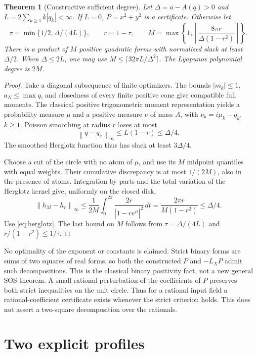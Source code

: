 \documentclass[11pt,a4paper]{article}
\newtheorem{theorem}{Theorem}[section]
\theoremstyle{remark}\newtheorem{remark}[theorem]{Remark}
\newcommand{\norm}[1]{\left\lVert #1\right\rVert}
\begin{document}
\begin{theorem}[Constructive sufficient degree]\label{thm:degree}
Let \(\Delta=a-A(q)>0\) and
\(L=2\sum_{k\geq1}k|q_k|<\infty\).
If \(L=0\), \(P=x^2+y^2\) is a certificate.
Otherwise let
\[
 \tau=\min\{1/2,\Delta/(4L)\},\qquad r=1-\tau,\qquad
 M=\max\left\{1,\left\lceil\frac{8\pi r}
                      {\Delta(1-r^2)}\right\rceil\right\}.
\]
There is a product of \(M\) positive quadratic forms with
normalized slack at least \(\Delta/2\).
When \(\Delta\leq2L\), one may use
\(M\leq\lceil32\pi L/\Delta^2\rceil\).
The Lyapunov polynomial degree is \(2M\).
\end{theorem}
\begin{proof}
Take a diagonal subsequence of finite optimizers. The bounds
\(|m_k|\leq1\), \(a_N\leq\max q\), and closedness of every finite
positive cone give compatible full moments. The classical
positive trigonometric moment representation yields a probability
measure \(\mu\) and a positive measure \(\nu\) of mass \(A\), with
\(\nu_k=i\mu_k-q_k\), \(k\geq1\).
Poisson smoothing at radius \(r\) loses at most
\[
 \norm{q-q_r}_\infty\leq L(1-r)\leq\Delta/4.
\]
The smoothed Herglotz function thus has slack at least \(3\Delta/4\).

Choose a cut of the circle with no atom of \(\mu\), and use its
\(M\) midpoint quantiles with equal weights. Their cumulative
discrepancy is at most \(1/(2M)\), also in the presence of atoms.
Integration by parts and the total variation of the Herglotz kernel
give, uniformly on the closed disk,
\[
 \norm{h_M-h_r}_\infty
 \leq\frac1{2M}\int_0^{2\pi}\frac{2r}{|1-re^{it}|^2}\,dt
 =\frac{2\pi r}{M(1-r^2)}\leq\Delta/4.
\]
Use \eqref{eq:herglotz}. The last bound on \(M\) follows from
\(\tau=\Delta/(4L)\) and
\(r/(1-r^2)\leq1/\tau\).
\end{proof}

No optimality of the exponent or constants is claimed.
Strict binary forms are sums of two squares of real forms, so both
the constructed \(P\) and \(-L_XP\) admit such decompositions.
This is the classical binary positivity fact, not a new general
SOS theorem. A small rational perturbation of the coefficients of
\(P\) preserves both strict inequalities on the unit circle.
Thus for a rational input field a rational-coefficient certificate
exists whenever the strict criterion holds. This does not assert
a two-square decomposition over the rationals.

\section{Two explicit profiles}
\end{document}

